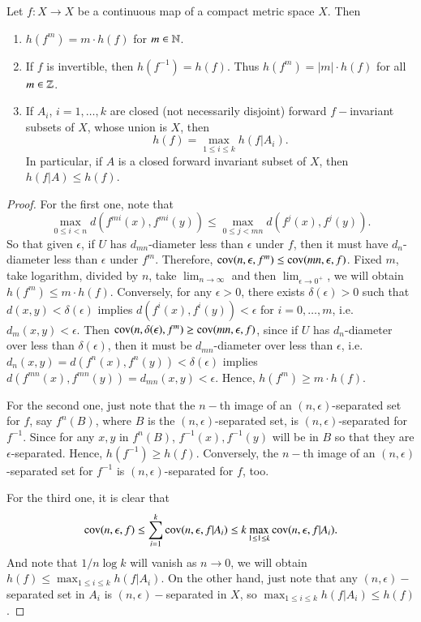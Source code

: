 \documentclass[12pt,a4paper]{article}
\begin{document}
	\begin{proposition}{}{}
		Let $f:X\to X$ be a continuous map of a compact metric space $X$. Then 
		\begin{enumerate}
			\item $h(f^m)=m\cdot h(f)$ for $m\in \mathbb{N}$.
			\item If $f$ is invertible, then $h(f^{-1})=h(f)$. Thus $h(f^m)=|m|\cdot h(f)$ for all $m\in \mathbb{Z}$.
			\item If $A_i$, $i=1,\dots,k$ are closed (not necessarily disjoint) forward $f-$invariant subsets of $X$, whose union is $X$, then 
			$$
			h(f) = \max_{1\leq i\leq k} h(f|A_i).
			$$ 
			In particular, if $A$ is a closed forward invariant subset of $X$, then $h(f|A)\leq h(f)$.
		\end{enumerate} 
	\end{proposition}
	\begin{proof}
		For the first one, note that
		$$
		\max_{0\leq i<n} d(f^{mi}(x),f^{mi}(y))\leq \max_{0\leq j<mn} d(f^j(x), f^j(y)).
		$$
		So that given $\epsilon$, if $U$ has $d_{mn}$-diameter less than $\epsilon$ under $f$, then it must have $d_n$-diameter less than $\epsilon$ under $f^m$. Therefore, $\text{cov}(n,\epsilon,f^m)\leq \text{cov}(mn,\epsilon,f)$. Fixed $m$, take logarithm, divided by $n$, take $\lim_{n\to\infty}$ and then $\lim_{\epsilon\to 0^+}$, we will obtain $h(f^m)\leq m\cdot h(f)$. Conversely, for any $\epsilon>0$, there exists $\delta(\epsilon)>0$ such that $d(x,y)<\delta(\epsilon)$ implies $d(f^i(x),f^i(y))<\epsilon$ for $i=0,\dots,m$, i.e. $d_m(x,y)<\epsilon$. Then $\text{cov}(n,\delta(\epsilon),f^m)\geq \text{cov}(mn, \epsilon,f)$, since if $U$ has $d_{n}$-diameter over less than $\delta(\epsilon)$, then it must be $d_{mn}$-diameter over less than $\epsilon$, i.e. $d_n(x,y)=d(f^n(x),f^n(y))<\delta(\epsilon)$ implies $ d(f^{mn}(x),f^{mn}(y))=d_{mn}(x,y)<\epsilon$. Hence, $h(f^m)\geq m\cdot h(f)$.
		
		For the second one, just note that the $n-$th image of an $(n,\epsilon)$-separated set for $f$, say $f^n(B)$, where $B$ is the $(n,\epsilon)$-separated set, is $(n,\epsilon)$-separated for $f^{-1}$. Since for any $x,y$ in $f^n(B)$, $f^{-1}(x), f^{-1}(y)$ will be in $B$ so that they are $\epsilon$-separated. Hence, $h(f^{-1})\geq h(f)$. Conversely, the $n-$th image of an $(n,\epsilon)$-separated set for $f^{-1}$ is $(n,\epsilon)$-separated for $f$, too.
		
		For the third one, it is clear that 
		$$
		\text{cov}(n,\epsilon,f)\leq \sum_{i=1}^k \text{cov}(n,\epsilon,f|A_i)\leq k \max_{1\leq 1\leq k} \text{cov}(n,\epsilon,f|A_i).
		$$
		And note that $1/n\log k$ will vanish as $n\to 0$, we will obtain $h(f)\leq \max_{1\leq i\leq k}h(f|A_i)$. On the other hand, just note that any $(n,\epsilon)-$separated set in $A_i$ is $(n,\epsilon)-$separated in $X$, so $\max_{1\leq i\leq k}h(f|A_i)\leq h(f)$.
	\end{proof}
	
\end{document}
